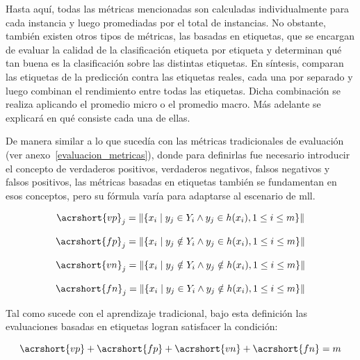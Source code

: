 Hasta aquí, todas las métricas mencionadas son calculadas individualmente para
cada instancia y luego promediadas por el total de instancias. No obstante,
también existen otros tipos de métricas, las basadas en etiquetas, que se
encargan de evaluar la calidad de la clasificación etiqueta por etiqueta y
determinan qué tan buena es la clasificación sobre las distintas etiquetas.  En
síntesis, comparan las etiquetas de la predicción contra las etiquetas reales,
cada una por separado y luego combinan el rendimiento entre todas las etiquetas.
Dicha combinación se realiza aplicando el promedio micro o el promedio macro.
Más adelante se explicará en qué consiste cada una de ellas.

De manera similar a lo que sucedía con las métricas tradicionales de evaluación
(ver anexo~\ref{evaluacion_metricas}), donde para definirlas fue necesario
introducir el concepto de verdaderos positivos, verdaderos negativos, falsos
negativos y falsos positivos, las métricas basadas en etiquetas también se
fundamentan en esos conceptos, pero su fórmula varía para adaptarse al escenario
de \acrshort{mll}.

\begin{equation}
	\acrshort{vp}_{j} = \left\|\{x_{i}\mid y_{j} \in Y_{i} \land y_{j} \in
	h(x_{i}), 1 \leq i \leq m\}\right\|
\end{equation}

\begin{equation}
	\acrshort{fp}_{j} = \left\|\{x_{i}\mid y_{j} \notin Y_{i} \land y_{j} \in
	h(x_{i}), 1 \leq i \leq m\}\right\|
\end{equation}

\begin{equation}
	\acrshort{vn}_{j} = \left\|\{x_{i}\mid y_{j} \notin Y_{i} \land y_{j} \notin
	h(x_{i}), 1 \leq i \leq m\}\right\|
\end{equation}

\begin{equation}
	\acrshort{fn}_{j} = \left\|\{x_{i}\mid y_{j} \in Y_{i} \land y_{j} \notin
	h(x_{i}), 1 \leq i \leq m\}\right\|
\end{equation}

Tal como sucede con el aprendizaje tradicional, bajo esta definición las
evaluaciones basadas en etiquetas logran satisfacer la condición:

\begin{equation}
	\acrshort{vp} + \acrshort{fp} + \acrshort{vn} + \acrshort{fn} = m
\end{equation}

